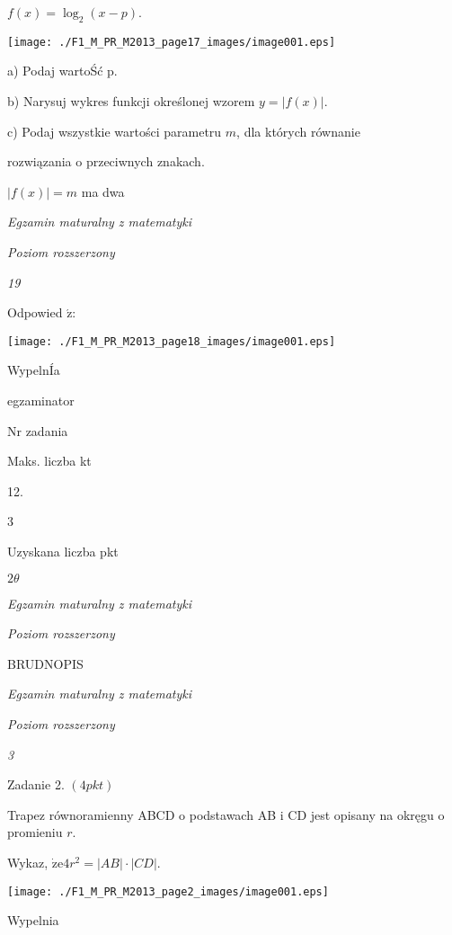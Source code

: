 \documentclass[a4paper,12pt]{article}
\begin{document}
$f(x)=\log_{2}(x-p).$
\begin{center}
\texttt{[image: ./F1\_M\_PR\_M2013\_page17\_images/image001.eps]}
\end{center}
a) Podaj wartoŚć p.

b) Narysuj wykres funkcji określonej wzorem $y=|f(x)|.$

c) Podaj wszystkie wartości parametru $m$, dla których równanie

rozwiązania o przeciwnych znakach.

$|f(x)|=m$ ma dwa





{\it Egzamin maturalny z matematyki}

{\it Poziom rozszerzony}

{\it 19}

Odpowied $\acute{\mathrm{z}}$:
\begin{center}
\texttt{[image: ./F1\_M\_PR\_M2013\_page18\_images/image001.eps]}
\end{center}
WypelnÍa

egzaminator

Nr zadania

Maks. liczba kt

12.

3

Uzyskana liczba pkt





$ 2\theta$

{\it Egzamin maturalny z matematyki}

{\it Poziom rozszerzony}

BRUDNOPIS





{\it Egzamin maturalny z matematyki}

{\it Poziom rozszerzony}

{\it 3}

Zadanie 2. $(4pkt)$

Trapez równoramienny ABCD o podstawach AB $\mathrm{i}$ CD jest opisany na okręgu o promieniu $r.$

Wykaz, $\dot{\mathrm{z}}\mathrm{e}4r^{2}=|AB|\cdot|CD|.$
\begin{center}
\texttt{[image: ./F1\_M\_PR\_M2013\_page2\_images/image001.eps]}
\end{center}
Wypelnia
\end{document}
